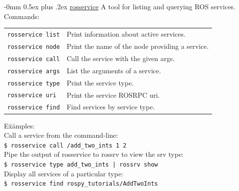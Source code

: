 \documentclass[10pt,landscape]{article}
\makeatletter
\renewcommand{\subsection}{\@startsection{subsection}{2}{0mm}%
                                {-0mm}%
                                {0.5ex plus .2ex}%
                                {\normalfont\normalsize\bfseries}}
\makeatother
\begin{document}
\begin{multicols}{3}
\subsection{\href{http://wiki.ros.org/rosservice}{rosservice}}
A tool for listing and querying ROS services.\\
\vspace{2.5 mm}
Commands: \\
\begin{tabular}{@{}p{\the\MyLen}%
                @{}p{\linewidth-\the\MyLen}@{}}
\texttt{rosservice list}  & Print information about active services. \\
\texttt{rosservice node}  & Print the name of the node providing a service. \\
\texttt{rosservice call}  & Call the service with the given args. \\
\texttt{rosservice args}  & List the arguments of a service. \\
\texttt{rosservice type}  & Print the service type. \\
\texttt{rosservice uri}   & Print the service ROSRPC uri. \\
\texttt{rosservice find}  & Find services by service type.
\end{tabular}
\vspace{-2.5 mm}
\begin{tabbing}
E\=x\=amples:\\
\> Call a service from the command-line:\\
\> \>\texttt{\$ rosservice call /add\_two\_ints 1 2}\\
\> Pipe the output of rosservice to rossrv to view the srv type:\\
\> \>\texttt{\$ rosservice type add\_two\_ints | rossrv show}\\
\> Display all services of a particular type:\\
\> \>\texttt{\$ rosservice find rospy\_tutorials/AddTwoInts}\\
\end{tabbing}

\vspace{-1.5 mm}

\end{multicols}
\end{document}
